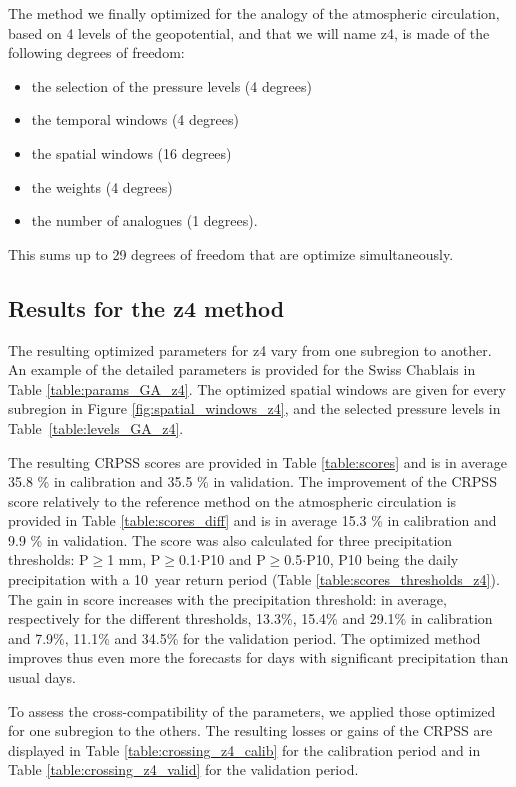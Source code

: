 \documentclass{ametsoc}
\begin{document}
The method we finally optimized for the analogy of the atmospheric circulation, based on 4 levels of the geopotential, and that we will name z4, is made of the following degrees of freedom:

\begin{itemize}
	\setlength\itemsep{-4px}
	\item the selection of the pressure levels (4 degrees)
	\item the temporal windows (4 degrees)
	\item the spatial windows (16 degrees)
	\item the weights (4 degrees)
	\item the number of analogues (1 degrees).
\end{itemize}

This sums up to 29 degrees of freedom that are optimize simultaneously.


\subsection{Results for the z4 method}

The resulting optimized parameters for z4 vary from one subregion to another. An example of the detailed parameters is provided for the Swiss Chablais in Table \ref{table:params_GA_z4}. The optimized spatial windows are given for every subregion in Figure \ref{fig:spatial_windows_z4}, and the selected pressure levels in Table~\ref{table:levels_GA_z4}. 

The resulting CRPSS scores are provided in Table \ref{table:scores} and is in average 35.8 \% in calibration and 35.5 \% in validation. The improvement of the CRPSS score relatively to the reference method on the atmospheric circulation is provided in Table \ref{table:scores_diff} and is in average 15.3 \% in calibration and 9.9 \% in validation. The score was also calculated for three precipitation thresholds: P\(\geq\)1 mm, P\(\geq\)0.1\(\cdot\)P10 and P\(\geq\)0.5\(\cdot\)P10, P10 being the daily precipitation with a 10~year return period (Table \ref{table:scores_thresholds_z4}). The gain in score increases with the precipitation threshold: in average, respectively for the different thresholds, 13.3\%, 15.4\% and 29.1\% in calibration and 7.9\%, 11.1\% and 34.5\% for the validation period. The optimized method improves thus even more the forecasts for days with significant precipitation than usual days.

To assess the cross-compatibility of the parameters, we applied those optimized for one subregion to the others. The resulting losses or gains of the CRPSS are displayed in Table \ref{table:crossing_z4_calib} for the calibration period and in Table \ref{table:crossing_z4_valid} for the validation period.
\end{document}
